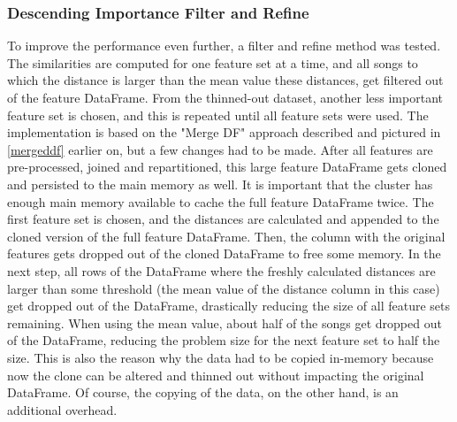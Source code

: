 \subsubsection{Descending Importance Filter and Refine}\label{farfs}

To improve the performance even further, a filter and refine method was tested. The similarities are computed for one feature set at a time, and all songs to which the distance is larger than the mean value these distances, get filtered out of the feature DataFrame. From the thinned-out dataset, another less important feature set is chosen, and this is repeated until all feature sets were used. 
The implementation is based on the "Merge DF" approach described and pictured in \ref{mergeddf} earlier on, but a few changes had to be made. After all features are pre-processed, joined and repartitioned, this large feature DataFrame gets cloned and persisted to the main memory as well. It is important that the cluster has enough main memory available to cache the full feature DataFrame twice. 
\noindent The first feature set is chosen, and the distances are calculated and appended to the cloned version of the full feature DataFrame. Then, the column with the original features gets dropped out of the cloned DataFrame to free some memory. In the next step, all rows of the DataFrame where the freshly calculated distances are larger than some threshold (the mean value of the distance column in this case) get dropped out of the DataFrame, drastically reducing the size of all feature sets remaining.
When using the mean value, about half of the songs get dropped out of the DataFrame, reducing the problem size for the next feature set to half the size. This is also the reason why the data had to be copied in-memory because now the clone can be altered and thinned out without impacting the original DataFrame. Of course, the copying of the data, on the other hand, is an additional overhead. 

